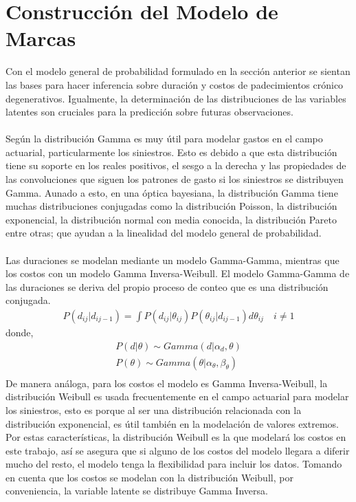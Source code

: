 \section{Construcci\'on del Modelo de Marcas}
Con el modelo general de probabilidad formulado en la secci\'on anterior se sientan las bases para hacer inferencia sobre duraci\'on y costos de padecimientos cr\'onico degenerativos. Igualmente, la determinaci\'on de las distribuciones de las variables latentes son cruciales para la predicci\'on sobre futuras observaciones.\\
\\
Seg\'un \cite{fader2013gamma} la distribuci\'on Gamma es muy \'util para modelar gastos en el campo actuarial, particularmente los siniestros. Esto es debido a que esta distribuci\'on tiene su soporte en los reales positivos, el sesgo a la derecha y las propiedades de las convoluciones que siguen los patrones de gasto si los siniestros se distribuyen Gamma. Aunado a esto, en una \'optica bayesiana, la distribuci\'on Gamma tiene muchas distribuciones conjugadas como la distribuci\'on Poisson, la distribuci\'on exponencial, la distribuci\'on normal con media conocida, la distribuci\'on Pareto entre otras; que ayudan a la linealidad del modelo general de probabilidad.\\
\\
Las duraciones se modelan mediante un modelo Gamma-Gamma, mientras que los costos con un modelo Gamma Inversa-Weibull. El modelo Gamma-Gamma de las duraciones se deriva del propio proceso de conteo que es una distribuci\'on conjugada.
\begin{align*}
P(d_{ij}|d_{ij-1})=\int P(d_{ij}|\theta_{ij}) P(\theta_{ij}|d_{ij-1})d\theta_{ij} \quad i \neq 1
\end{align*}
donde,
\begin{align*}
P(d|\theta) \sim Gamma(d|\alpha_d,\theta)\\
P(\theta) \sim Gamma(\theta|\alpha_{\theta},\beta_\theta)\\
\end{align*}
De manera an\'aloga, para los costos el modelo es Gamma Inversa-Weibull, la distribuci\'on Weibull es usada frecuentemente en el campo actuarial para modelar los siniestros, esto es porque al ser una distribuci\'on relacionada con la distribuci\'on exponencial, es \'util tambi\'en en la modelaci\'on de valores extremos. Por estas caracter\'isticas, la distribuci\'on Weibull es la que modelar\'a los costos en este trabajo, as\'i se asegura que si alguno de los costos del modelo llegara a diferir mucho del resto, el modelo tenga la flexibilidad para incluir los datos. Tomando en cuenta que los costos se modelan con la distribuci\'on Weibull, por conveniencia, la variable latente se distribuye Gamma Inversa.
